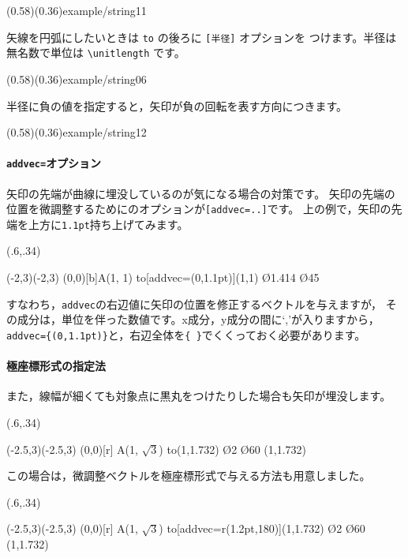 (0.58)(0.36){example/string11}

矢線を円弧にしたいときは \verb+to+ の後ろに \verb+[半径]+ オプションを
つけます。半径は無名数で単位は \verb+\unitlength+ です。

(0.58)(0.36){example/string06}

半径に負の値を指定すると，矢印が負の回転を表す方向につきます。

(0.58)(0.36){example/string12}


\paragraph{\texttt{addvec=}オプション}
矢印の先端が曲線に埋没しているのが気になる場合の対策です。
矢印の先端の位置を微調整するためにのオプションが\texttt{[addvec=..]}です。
上の例で，矢印の先端を上方に\texttt{1.1pt}持ち上げてみます。

\begin{showEx}(.6,.34){}
  \begin{zahyou}[ul=7.5mm](-2,3)(-2,3)
    (0,0)[b]{A(1, 1)}%
      to[addvec={(0,1.1pt)}]{(1,1)}
    {\Thicklines
      \En\O{1.414}
      \kTyokusen\O{45}{}{}
    }%
  \end{zahyou}
\end{showEx}

すなわち，\texttt{addvec}の右辺値に矢印の位置を修正するベクトルを与えますが，
その成分は，単位を伴った数値です。x成分，y成分の間に`,'が入りますから，
\verb+addvec={(0,1.1pt)}+と，右辺全体を\verb+{ }+でくくっておく必要があります。

\paragraph{極座標形式の指定法}
また，線幅が細くても対象点に黒丸をつけたりした場合も矢印が埋没します。

\begin{showEx}(.6,.34){}
  \begin{zahyou}[ul=7.5mm](-2.5,3)(-2.5,3)
    \def\A{(1,1.732)}
    (0,0)[r]%
      {A(1, $\sqrt3$)}%
      to\A
    \En\O{2}
    \kTyokusen\O{60}{}{}
    \Kuromaru\A
  \end{zahyou}
\end{showEx}

この場合は，微調整ベクトルを極座標形式で与える方法も用意しました。

\begin{showEx}(.6,.34){}
  \begin{zahyou}[ul=7.5mm](-2.5,3)(-2.5,3)
    \def\A{(1,1.732)}
    (0,0)[r]%
      {A(1, $\sqrt3$)}%
      to[addvec={r(1.2pt,180)}]\A
    \En\O{2}
    \kTyokusen\O{60}{}{}
    \Kuromaru\A
  \end{zahyou}
\end{showEx}

